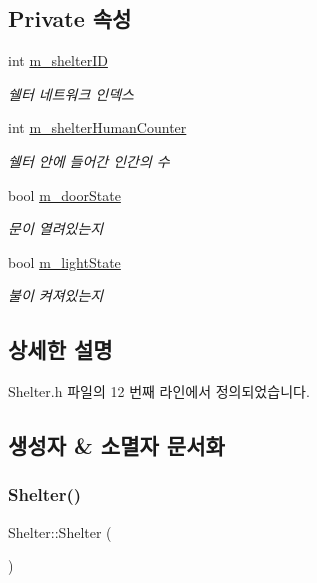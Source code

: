 \subsection*{Private 속성}
\begin{DoxyCompactItemize}
\item 
int \hyperlink{class_shelter_a158439448d67e4991a19dd7175a78a0b}{m\+\_\+shelter\+ID}
\begin{DoxyCompactList}\small\item\em 쉘터 네트워크 인덱스 \end{DoxyCompactList}\item 
int \hyperlink{class_shelter_a31a7132fc38ce768924bb59302d02d82}{m\+\_\+shelter\+Human\+Counter}
\begin{DoxyCompactList}\small\item\em 쉘터 안에 들어간 인간의 수 \end{DoxyCompactList}\item 
bool \hyperlink{class_shelter_a8deab51bd304b5cb728c2e739f5afa15}{m\+\_\+door\+State}
\begin{DoxyCompactList}\small\item\em 문이 열려있는지 \end{DoxyCompactList}\item 
bool \hyperlink{class_shelter_ad18359b14559c0f0e77fdb416b39529f}{m\+\_\+light\+State}
\begin{DoxyCompactList}\small\item\em 불이 켜져있는지 \end{DoxyCompactList}\end{DoxyCompactItemize}


\subsection{상세한 설명}


Shelter.\+h 파일의 12 번째 라인에서 정의되었습니다.



\subsection{생성자 \& 소멸자 문서화}
\mbox{\label{class_shelter_afcd0de261925dbb0d6efe948625708b9}} 
\subsubsection{\texorpdfstring{Shelter()}{Shelter()}}
{\footnotesize\ttfamily Shelter\+::\+Shelter (\begin{DoxyParamCaption}{ }\end{DoxyParamCaption})}



